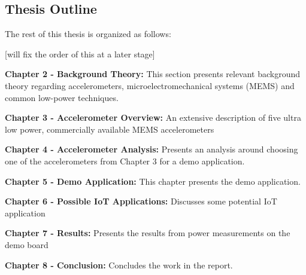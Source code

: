 \subsection{Thesis Outline}

The rest of this thesis is organized as follows:

[will fix the order of this at a later stage]

\textbf{Chapter 2 - Background Theory:} This section presents relevant background theory regarding accelerometers, microelectromechanical systems (MEMS) and common low-power techniques.  

\textbf{Chapter 3 - Accelerometer Overview:} An extensive description of five ultra low power, commercially available MEMS accelerometers

\textbf{Chapter 4 - Accelerometer Analysis:} Presents an analysis around choosing one of the accelerometers from Chapter 3 for a demo application.

\textbf{Chapter 5 - Demo Application:} This chapter presents the demo application.

\textbf{Chapter 6 - Possible IoT Applications:} Discusses some potential IoT application

\textbf{Chapter 7 - Results:} Presents the results from power measurements on the demo board

\textbf{Chapter 8 - Conclusion:} Concludes the work in the report.

